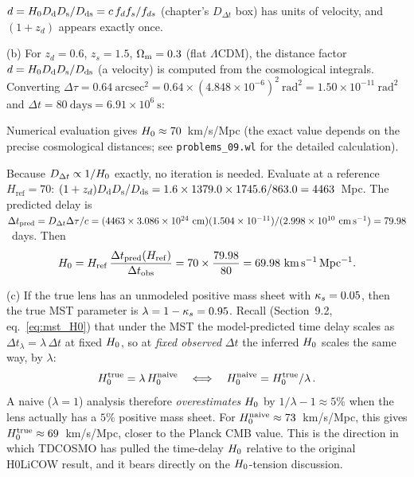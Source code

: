 \begin{annotation}
$d = H_0D_{\mathrm{d}}D_{\mathrm{s}}/D_{\mathrm{ds}} = c\,f_df_s/f_{ds}$ (chapter's
$D_{\Delta t}$ box) has units of velocity, and $(1+z_d)$ appears exactly once.
\end{annotation}


(b) For $z_d = 0.6$, $z_s = 1.5$, $\Omega_{\mathrm{m}} = 0.3$
(flat $\Lambda$CDM), the distance factor
$d = H_0D_{\mathrm{d}}D_{\mathrm{s}}/D_{\mathrm{ds}}$ (a velocity) is computed from the cosmological
integrals.  Converting $\Delta\tau = 0.64~\mathrm{arcsec}^2
= 0.64 \times (4.848 \times 10^{-6})^2~\mathrm{rad}^2
= 1.50 \times 10^{-11}~\mathrm{rad}^2$ and
$\Delta t = 80~\mathrm{days} = 6.91 \times 10^6~\mathrm{s}$:

Numerical evaluation gives $H_0 \approx 70$~km/s/Mpc
(the exact value depends on the precise cosmological distances;
see \texttt{problems\_09.wl} for the detailed calculation). \checkmark

\begin{derivation}
Because $D_{\Delta t} \propto 1/H_0$ exactly, no iteration is needed.
Evaluate at a reference $H_{\mathrm{ref}} = 70$:
$(1+z_d)D_{\mathrm{d}}D_{\mathrm{s}}/D_{\mathrm{ds}} = 1.6\times1379.0\times1745.6/863.0 = 4463$~Mpc.  The
predicted delay is
$\Delta t_{\mathrm{pred}} = D_{\Delta t}\Delta\tau/c =
(4463\times3.086\times10^{24}~\mathrm{cm})(1.504\times10^{-11})/
(2.998\times10^{10}~\mathrm{cm\,s^{-1}}) = 79.98$~days.  Then
\[
  H_0 = H_{\mathrm{ref}}\,\frac{\Delta t_{\mathrm{pred}}(H_{\mathrm{ref}})}{\Delta t_{\mathrm{obs}}}
  = 70\times\frac{79.98}{80} = 69.98~\mathrm{km\,s^{-1}\,Mpc^{-1}} .
\]
\end{derivation}


(c) If the true lens has an unmodeled positive mass sheet
with $\kappa_s = 0.05$, then the true MST parameter is
$\lambda = 1 - \kappa_s = 0.95$.  Recall (Section~9.2,
eq.~\ref{eq:mst_H0}) that under the MST the model-predicted time
delay scales as $\Delta t_\lambda = \lambda\,\Delta t$ at fixed
$H_0$, so at \emph{fixed observed} $\Delta t$ the inferred
$H_0$ scales the same way, by $\lambda$:
\begin{equation*}
    H_0^{\mathrm{true}} = \lambda\,H_0^{\mathrm{naive}}
    \quad\Longleftrightarrow\quad
    H_0^{\mathrm{naive}} = H_0^{\mathrm{true}} / \lambda \,.
\end{equation*}
A naive ($\lambda = 1$) analysis therefore \emph{overestimates}
$H_0$ by $1/\lambda - 1 \approx 5\%$ when the lens actually has a
$5\%$ positive mass sheet.  For
$H_0^{\mathrm{naive}} \approx 73$~km/s/Mpc, this gives
$H_0^{\mathrm{true}} \approx 69$~km/s/Mpc, closer to the Planck
CMB value.  This is the direction in which TDCOSMO has pulled the
time-delay $H_0$ relative to the original H0LiCOW result, and it
bears directly on the $H_0$-tension discussion. \checkmark

